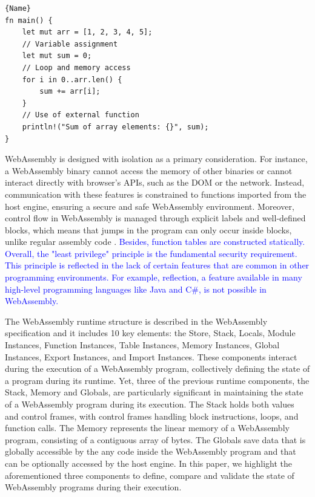 \documentclass[a4paper,fleqn]{cas-dc}
\newcommand*\badge[1]{ \colorbox{red}{\color{white}#1}}
\newcommand{\Wasm}{WebAssembly\xspace}
\newcommand{\revision}[1]{\textcolor{blue}{#1}}
\newcommand{\todo}[1]{%
\refstepcounter{todo}
\noindent\textbf{\badge{TODO}} {\color{red}#1}
\addcontentsline{td}{todo}
{\color{red}\thesection.\thetodo\xspace #1}}
\begin{document}
{
\begin{lstlisting}[label=example:cprogram,caption={A Rust program containing function declaration, loop, conditional and memory access.},captionpos=b]{Name}
fn main() {
    let mut arr = [1, 2, 3, 4, 5];
    // Variable assignment
    let mut sum = 0;
    // Loop and memory access
    for i in 0..arr.len() {
        sum += arr[i];
    }
    // Use of external function
    println!("Sum of array elements: {}", sum);
}
\end{lstlisting}   
}





WebAssembly is designed with isolation as a primary consideration. 
For instance, a WebAssembly binary cannot access the memory of other binaries or cannot interact directly with browser's APIs, such as the DOM or the network. Instead, communication with these features is constrained to functions imported from the host engine, ensuring a secure and safe WebAssembly environment.
Moreover, control flow in WebAssembly is managed through explicit labels and well-defined blocks, which means that jumps in the program can only occur inside blocks, unlike regular assembly code \cite{10.1145/3062341.3062363}.
\revision{
Besides, function tables are constructed statically.
Overall, the "least privilege" principle is the fundamental security requirement. 
This principle is reflected in the lack of certain features that are common in other programming environments.
For example, reflection, a feature available in many high-level programming languages like Java and C\#, is not possible in \Wasm. 
}





The WebAssembly runtime structure is described in the WebAssembly specification and it includes 10 key elements: the Store, Stack, Locals, Module Instances, Function Instances, Table Instances, Memory Instances, Global Instances, Export Instances, and Import Instances. These components interact during the execution of a WebAssembly program, collectively defining the state of a program during its runtime.
Yet, three of the previous runtime components, the Stack, Memory and Globals, are particularly significant in maintaining the state of a WebAssembly program during its execution. 
The Stack holds both values and control frames, with control frames handling block instructions, loops, and function calls. 
The Memory represents the linear memory of a WebAssembly program, consisting of a contiguous array of bytes.
The Globals save data that is globally accessible by the any code inside the \Wasm program and that can be optionally accessed by the host engine.
In this paper, we highlight the aforementioned three components to define, compare and validate the state of WebAssembly programs during their execution. 
\end{document}
